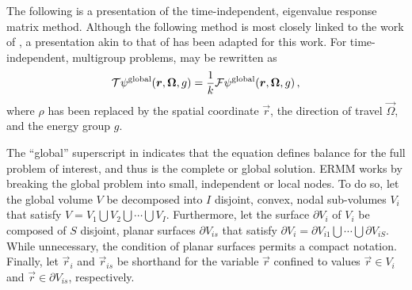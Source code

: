The following is a presentation of the time-independent, eigenvalue response 
matrix method.  Although the following method is most closely 
linked to the work of \citet{RobertsSerment}, a presentation akin to 
that of \citet{roberts2014hot} has been adapted for this work.  For 
time-independent, multigroup problems,  may be rewritten as
\begin{equation}
    \begin{split}
        \oper{T}\psi^{\mathrm{global}}(\vec{r},\vec{\Omega},g) = 
        \frac{1}{k} \oper{F} \psi^{\mathrm{global}}(\vec{r},\vec{\Omega},g)  
        \, ,
    \end{split}   
    \label{eq:global}
\end{equation}
where $\rho$ has been replaced by the spatial coordinate $\vec{r}$, the 
direction of travel $\vec{\Omega}$, and the energy group $g$. 

The ``global'' superscript in  indicates that the equation defines 
balance for the full problem of interest, and thus is the complete or global 
solution.  ERMM works by breaking the global problem into small, independent or 
local nodes. To do so, let the global volume $V$ be decomposed into $I$ 
disjoint, convex, nodal 
sub-volumes $V_i$ that satisfy $V = V_1 \bigcup V_2 \bigcup \cdots \bigcup 
V_I$. Furthermore, let the surface $\partial V_i$ of $V_i$ be composed of
$S$ disjoint, planar surfaces $\partial V_{is}$ that satisfy $\partial V_i = 
\partial V_{i1} \bigcup \cdots \bigcup \partial V_{iS}$. While unnecessary, 
the condition of planar surfaces permits a compact notation.  Finally, let 
$\vec{r}_i$ and $\vec{r}_{is}$ be shorthand for the variable $\vec{r}$ 
confined to values $\vec{r}\in V_i$ and $\vec{r} \in \partial V_{is}$, 
respectively. 

